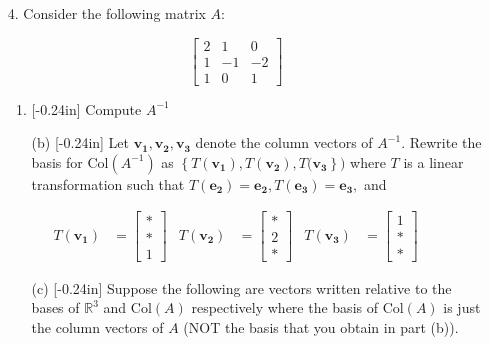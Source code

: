 \documentclass[letterpaper,12pt]{article}
\newcommand{\set}[1]{\left\{ #1 \right\}}
\theoremstyle{definition}
\begin{document}
\pagebreak
\begin{enumerate}
    \item[4.]  Consider the following matrix $A:$ \end{enumerate}
     $$\begin{bmatrix}
        2 & 1 & 0  \\
        1 & -1 & -2 \\
        1 & 0 & 1 
    \end{bmatrix}$$
\begin{enumerate}
\item[]
    \begin{enumerate}
        \item\reversemarginpar{}[-0.24in] Compute $A^{-1}$
    \end{enumerate}
\end{enumerate}
\pagebreak
\begin{enumerate}
    \item[]\begin{enumerate}
        \item[(b)]\reversemarginpar{}[-0.24in] Let $\mathbf{v_1}, \mathbf{v_2},\mathbf{v_3}$ denote the column vectors of $A^{-1}$. Rewrite the basis for $\mathrm{Col}(A^{-1})$ as $\set{T(\mathbf{v_1}),T(\mathbf{v_2}),T(\mathbf{v_3}})$ where $T$ is a linear transformation such that $T(\mathbf{e_2})=\mathbf{e_2},T(\mathbf{e_3})=\mathbf{e_3},$ and 
    \end{enumerate}
\end{enumerate}
\begin{align*}
            T(\mathbf{v_1}) &=\begin{bmatrix}
                * \\ * \\ 1
            \end{bmatrix} & T(\mathbf{v_2}) &=\begin{bmatrix}
                * \\ 2 \\ *
            \end{bmatrix} & T(\mathbf{v_3}) &=\begin{bmatrix}
                1 \\ * \\ *
            \end{bmatrix}
        \end{align*}
\pagebreak
\begin{enumerate}
    \item[] \begin{enumerate}
        \item[(c)] \reversemarginpar{}[-0.24in]  Suppose the following are vectors written relative to the bases of $\mathbb{R}^3$ and $\mathrm{Col}(A)$ respectively where the basis of $\mathrm{Col}(A)$ is just the column vectors of $A$ (NOT the basis that you obtain in part (b)).
    \end{enumerate}
\end{enumerate}
\end{document}
